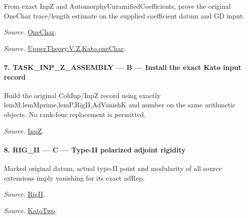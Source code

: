 \documentclass[11pt,a4paper]{article}
\numberwithin{equation}{section}
\theoremstyle{remark}\newtheorem{remark}[theorem]{Remark}
\begin{document}
From exact InpZ and AutomorphyUnramifiedCoefficients, prove the original OneChar trace/length estimate on the supplied coefficient datum and GD input.

\emph{Source.} \href{https://github.com/CocoSgt/riemann-hypothesis-lean/blob/7cbf7a0c32fca1badf05931879a37c3f8a2b03b4/src/Development/AutomorphicArithmetic/AutomorphicVarieties/UnitaryThreeGroups/KatoUse.lean#L54-L64}{OneChar}.

\emph{Source.} \href{https://github.com/CocoSgt/riemann-hypothesis-lean/blob/7cbf7a0c32fca1badf05931879a37c3f8a2b03b4/src/Development/AutomorphicArithmetic/AutomorphicVarieties/ModularityArgument/KatoQuadraticCharacters/OneChar.lean#L158-L178}{UpperTheory.V.Z.Kato.oneChar}.



\paragraph{7. TASK\_\allowbreak INP\_\allowbreak Z\_\allowbreak ASSEMBLY — B — Install the exact Kato input record}

Build the original CohInp/InpZ record using exactly lemM,lemMprime,lemP,RigII,AdVanishK and number on the same arithmetic objects. No rank-four replacement is permitted.

\emph{Source.} \href{https://github.com/CocoSgt/riemann-hypothesis-lean/blob/7cbf7a0c32fca1badf05931879a37c3f8a2b03b4/src/Development/AutomorphicArithmetic/AutomorphicVarieties/ModularityArgument/KatoQuadraticCharacters/KatoTwoOfUseN.lean#L55-L61}{InpZ}.



\paragraph{8. RIG\_\allowbreak II — C — Type-II polarized adjoint rigidity}

Marked original datum, actual type-II point and modularity of all source extensions imply vanishing for its exact adRep.

\emph{Source.} \href{https://github.com/CocoSgt/riemann-hypothesis-lean/blob/7cbf7a0c32fca1badf05931879a37c3f8a2b03b4/src/Development/AutomorphicArithmetic/AutomorphicVarieties/ModularityArgument/KatoQuadraticCharacters/KatoTwoOfUseN.lean#L49-L53}{RigII}.

\emph{Source.} \href{https://github.com/CocoSgt/riemann-hypothesis-lean/blob/7cbf7a0c32fca1badf05931879a37c3f8a2b03b4/src/Development/AutomorphicArithmetic/AutomorphicVarieties/ModularityArgument/KatoQuadraticCharacters/KatoTwoOfUseN.lean#L43-L47}{KatoTwo}.
\end{document}
